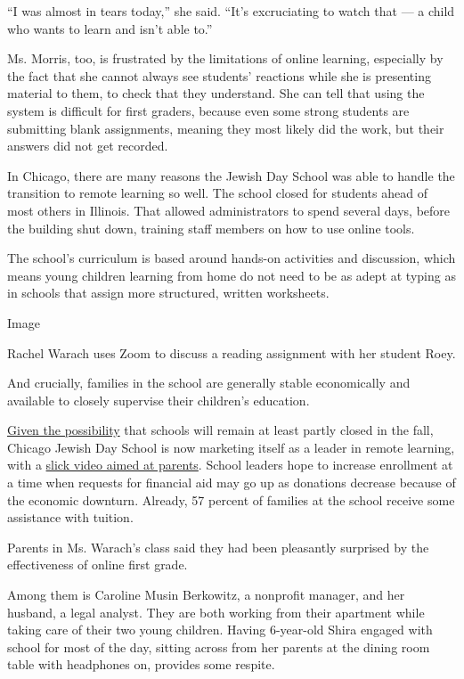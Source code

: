 ``I was almost in tears today,'' she said. ``It's excruciating to watch
that --- a child who wants to learn and isn't able to.''

Ms. Morris, too, is frustrated by the limitations of online learning,
especially by the fact that she cannot always see students' reactions
while she is presenting material to them, to check that they understand.
She can tell that using the system is difficult for first graders,
because even some strong students are submitting blank assignments,
meaning they most likely did the work, but their answers did not get
recorded.

In Chicago, there are many reasons the Jewish Day School was able to
handle the transition to remote learning so well. The school closed for
students ahead of most others in Illinois. That allowed administrators
to spend several days, before the building shut down, training staff
members on how to use online tools.

The school's curriculum is based around hands-on activities and
discussion, which means young children learning from home do not need to
be as adept at typing as in schools that assign more structured, written
worksheets.

Image

Rachel Warach uses Zoom to discuss a reading assignment with her student
Roey.

And crucially, families in the school are generally stable economically
and available to closely supervise their children's education.

\href{https://www.nytimes3xbfgragh.onion/2020/04/28/us/coronavirus-schools-reopen.html}{Given
the possibility} that schools will remain at least partly closed in the
fall, Chicago Jewish Day School is now marketing itself as a leader in
remote learning, with a
\href{https://vimeo.com/409618723?fbclid=IwAR3GArK9URuzo5b3YMRZtVaP6hRp0eektfrxCQV-_INSp0g8oQpStZHn7YU}{slick
video aimed at parents}. School leaders hope to increase enrollment at a
time when requests for financial aid may go up as donations decrease
because of the economic downturn. Already, 57 percent of families at the
school receive some assistance with tuition.

Parents in Ms. Warach's class said they had been pleasantly surprised by
the effectiveness of online first grade.

Among them is Caroline Musin Berkowitz, a nonprofit manager, and her
husband, a legal analyst. They are both working from their apartment
while taking care of their two young children. Having 6-year-old Shira
engaged with school for most of the day, sitting across from her parents
at the dining room table with headphones on, provides some respite.

